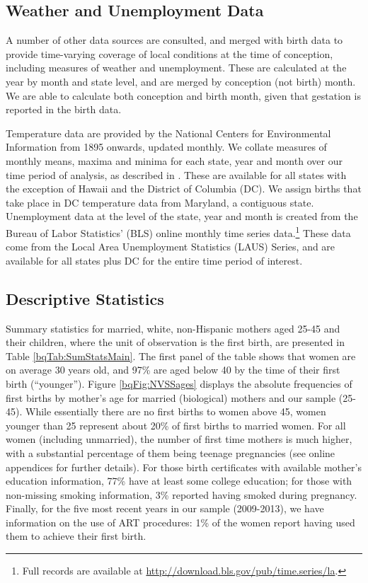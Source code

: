 \documentclass[a4paper, 12 pt]{article}
\theoremstyle{plain}
\begin{document}
\begin{doublespace}
\subsection{Weather and Unemployment Data}
A number of other data sources are consulted, and merged with birth data to provide time-varying coverage of local conditions at the time of conception, including measures of weather and unemployment. These are calculated at the year by month and state level, and are merged by conception (not birth) month.  We are able to calculate both conception and birth month, given that gestation is reported in the birth data.

Temperature data are provided by the National Centers for
Environmental Information from 1895 onwards, updated monthly.  We collate
measures of monthly means, maxima and minima for each state, year and month
over our time period of analysis, as described in \citet{Voseetal2014}. These are
available for all states with the exception of Hawaii and the District of Columbia (DC). We assign births that take place in DC temperature data from Maryland, a contiguous state. Unemployment data at the level of the state, year and month is
created from the Bureau of Labor Statistics' (BLS) online monthly time series
data.\footnote{Full records are available at
\href{http://download.bls.gov/pub/time.series/la}%
{http://download.bls.gov/pub/time.series/la}.} These data come from the Local
Area Unemployment Statistics (LAUS) Series, and are available for all states
plus DC for the entire time period of interest.

\subsection{Descriptive Statistics}

Summary statistics for married, white, non-Hispanic mothers aged 25-45 and their children, where the unit of observation is the first birth, are presented in Table \ref{bqTab:SumStatsMain}. The first panel of the table shows that women are on average 30 years old, and 97\% are aged below 40 by the time of their first birth (``younger''). Figure \ref{bqFig:NVSSages} displays the absolute frequencies of first births by mother's age for married (biological) mothers and our sample (25-45). While essentially there are no first births to women above 45, women younger than 25 represent about 20\% of first births to married women.  For all women (including unmarried), the number of first time mothers is much higher, with a substantial percentage of them being teenage pregnancies (see online appendices for further details). For those birth certificates with available mother's education information, 77\% have at least some college education; for those with non-missing smoking information, 3\% reported having smoked during pregnancy. Finally, for the five most recent years in our sample (2009-2013), we have information on the use of ART procedures: 1\% of the women report having used them to achieve their first birth.


\end{doublespace}
\end{document}
